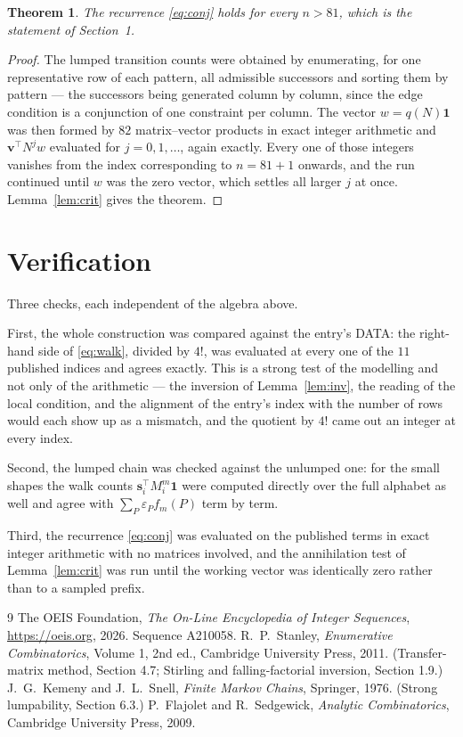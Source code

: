\documentclass[11pt,a4paper]{article}
\theoremstyle{plain}
\newtheorem{theorem}{Theorem}
\theoremstyle{definition}
\begin{document}
\begin{theorem}
The recurrence \eqref{eq:conj} holds for every $n>81$, which is the statement of
Section~1.
\end{theorem}

\begin{proof}
The lumped transition counts were obtained by enumerating, for one representative row of
each pattern, all admissible successors and sorting them by pattern --- the successors being
generated column by column, since the edge condition is a conjunction of one constraint per
column. The vector $w=q(N)\mathbf{1}$ was then formed by $82$ matrix--vector products
in exact integer arithmetic and $\mathbf{v}^{\!\top}N^{j}w$ evaluated for
$j=0,1,\dots$, again exactly. Every one of those integers vanishes from the index
corresponding to $n=81+1$ onwards, and the run continued until $w$ was the zero vector,
which settles all larger $j$ at once. Lemma~\ref{lem:crit} gives the theorem.
\end{proof}

\section{Verification}

Three checks, each independent of the algebra above.

First, the whole construction was compared against the entry's DATA: the right-hand side of
\eqref{eq:walk}, divided by $4!$, was evaluated at every one of the $11$
published indices and agrees exactly. This is a strong test of the modelling and not only of
the arithmetic --- the inversion of Lemma~\ref{lem:inv}, the reading of the local
condition, and the alignment of the entry's index with the number of rows would each
show up as a mismatch, and the quotient by $4!$ came out an integer at every index.

Second, the lumped chain was checked against the unlumped one: for the small shapes the walk
counts $\mathbf{s}_i^{\!\top}M_i^{m}\mathbf{1}$ were computed directly over the full
alphabet as well and agree with $\sum_P\varepsilon_Pf_m(P)$ term by term.

Third, the recurrence \eqref{eq:conj} was evaluated on the published terms in exact integer
arithmetic with no matrices involved, and the annihilation test of Lemma~\ref{lem:crit} was
run until the working vector was identically zero rather than to a sampled prefix.

\begin{thebibliography}{9}
 The OEIS Foundation, \emph{The On-Line Encyclopedia of Integer
Sequences}, \url{https://oeis.org}, 2026. Sequence A210058.
 R.~P.~Stanley, \emph{Enumerative Combinatorics}, Volume 1, 2nd ed.,
Cambridge University Press, 2011. (Transfer-matrix method, Section 4.7; Stirling and
falling-factorial inversion, Section 1.9.)
 J.~G.~Kemeny and J.~L.~Snell, \emph{Finite Markov Chains}, Springer,
1976. (Strong lumpability, Section 6.3.)
 P.~Flajolet and R.~Sedgewick, \emph{Analytic Combinatorics}, Cambridge
University Press, 2009.
\end{thebibliography}
\end{document}
